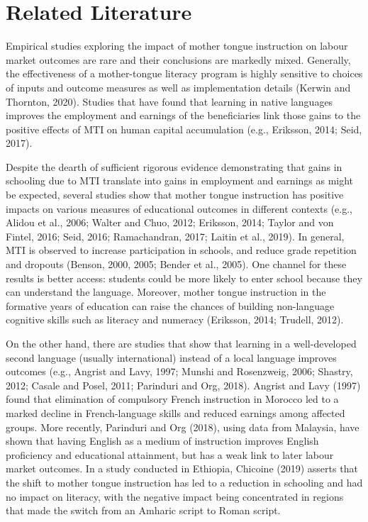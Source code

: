 
\section{Related Literature}

Empirical studies exploring the impact of mother tongue instruction on labour market outcomes are rare and their conclusions are markedly mixed. Generally, the effectiveness of a mother-tongue literacy program is highly sensitive to choices of inputs and outcome measures as well as implementation details (Kerwin and Thornton, 2020). Studies that have found that learning in native languages improves the employment and earnings of the beneficiaries link those gains to the positive effects of MTI on human capital accumulation (e.g., Eriksson, 2014; Seid, 2017). 

Despite the dearth of sufficient rigorous evidence demonstrating that gains in schooling due to MTI translate into gains in employment and earnings as might be expected, several studies show that mother tongue instruction has positive impacts on various measures of educational outcomes in different contexts (e.g., Alidou et al., 2006; Walter and Chuo, 2012; Eriksson, 2014; Taylor and von Fintel, 2016; Seid, 2016; Ramachandran, 2017; Laitin et al., 2019). In general, MTI is observed to increase participation in schools, and reduce grade repetition and dropouts (Benson, 2000, 2005; Bender et al., 2005). One channel for these results is better access: students could be more likely to enter school because they can understand the language. Moreover, mother tongue instruction in the formative years of education can raise the chances of building non-language cognitive skills such as literacy and numeracy (Eriksson, 2014; Trudell, 2012). 

On the other hand, there are studies that show that learning in a well-developed second language (usually international) instead of a local language improves outcomes (e.g., Angrist and Lavy, 1997; Munshi and Rosenzweig, 2006; Shastry, 2012; Casale and Posel, 2011; Parinduri and Org, 2018). Angrist and Lavy (1997) found that elimination of compulsory French instruction in Morocco led to a marked decline in French-language skills and reduced earnings among affected groups. More recently, Parinduri and Org (2018), using data from Malaysia, have shown that having English as a medium of instruction improves English proficiency and educational attainment, but has a weak link to later labour market outcomes. In a study conducted in Ethiopia, Chicoine (2019) asserts that the shift to mother tongue instruction has led to a reduction in schooling and had no impact on literacy, with the negative impact being concentrated in regions that made the switch from an Amharic script to Roman script. 

